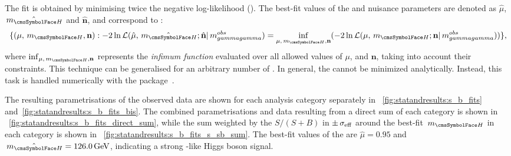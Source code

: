 The fit is obtained by minimising twice the negative log-likelihood (\NLL). 
The best-fit values of the \POI\s and nuisance parameters are denoted as $\hat{\mu}$, $\hat{\mH}$ and $\hat{\mathbf{n}}$, and correspond to :
\begin{equation}
\{ (\mu, \mH, \mathbf{n}) : -2 \ln \mathcal{L}(\hat{\mu}, \hat{\mH} ;\hat{\mathbf{n}}| \mgg^{obs}) = \inf _{\mu,\mH , \mathbf{n}}(-2 \ln \mathcal{L}(\mu, \mH; \mathbf{n}| \mgg^{obs})) \},
\end{equation}
where $\inf_{ \mu, \mH ,\mathbf{n}}$ represents the \emph{infimum function} evaluated over all allowed values of $\mu$, \mH and $\mathbf{n}$, taking into account their constraints. This technique can be generalised for an arbitrary number of \POI\s. In general, the \NLL cannot be minimized analytically. Instead, this task is handled numerically with the \Minuit package~\cite{minuit}. 

The resulting parametrisations of the observed data are shown for each analysis category separately in \Fig\s~\ref{fig:statandresults:s_b_fits} and~\ref{fig:statandresults:s_b_fits_bis}. The combined parametrisations and data  resulting from a direct sum of each category is shown in \Fig~\ref{fig:statandresults:s_b_fits_direct_sum}, while the sum weighted by the $S/(S+B)$ in $\pm \,\sigma_{\text{eff}}$ around the best-fit $\mH$ in each category is shown in \Fig~\ref{fig:statandresults:s_b_fits_s_sb_sum}. The best-fit values of the \POI\s are $\hat{\mu}= 0.95$ and $\hat{\mH}= 126.0\GeV$, indicating a strong \SM-like Higgs boson signal. 


